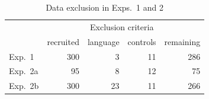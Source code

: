 \documentclass[11pt,fleqn]{article}
\newcommand{\6}{\mbox{$[\hspace*{-.6mm}[$}}
\newcommand{\9}{\mbox{$]\hspace*{-.6mm}]$}}
\begin{document}

\begin{table}[h!]
\centering
\begin{tabular}{l r | r r | r}
&  & \multicolumn{2}{c|}{Exclusion criteria} &  \\ 
&  recruited  & language & controls & remaining \\ 
\hline
Exp.~1 & 300 & 3 & 11 & 286 \\
Exp.~2a & 95 & 8 & 12 & 75 \\
Exp.~2b & 300 & 23 & 11 & 266 \\
\end{tabular}
\caption{Data exclusion in Exps.~1 and 2}\label{f-exclusion}
\end{table} 
\end{document}
